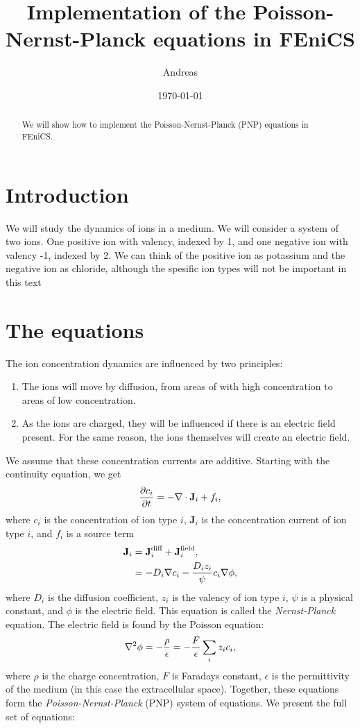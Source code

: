\documentclass[12pt]{article}
\title{Implementation of the Poisson-Nernst-Planck equations in FEniCS}
\date{\today}
\author{Andreas}
\newcommand{\Jvec}{\textbf{J}}
\begin{document}
\maketitle

\begin{abstract}
We will show how to implement the Poisson-Nernst-Planck (PNP) equations in FEniCS. 
\end{abstract}

\section{Introduction}
We will study the dynamics of ions in a medium. We will consider a system of two ions. One positive ion with valency, indexed by 1, and one negative ion with valency -1, indexed by 2. We can think of the positive ion as potassium and the negative ion as chloride, although the spesific ion types will not be important in this text

\section{The equations}
The ion concentration dynamics are influenced by two principles: 
\begin{enumerate}
\item The ions will move by diffusion, from areas of with high concentration to areas of low concentration. 
\item As the ions are charged, they will be influenced if there is an electric field present. For the same reason, the ions themselves will create an electric field. 
\end{enumerate}
We assume that these concentration currents are additive. Starting with the continuity equation, we get
\begin{equation}
{\partial c_i \over \partial t} = - \nabla \cdot \Jvec_i + f_i,
\end{equation}
where $c_i$ is the concentration of ion type $i$, $\Jvec_i$ is the concentration current of ion type $i$, and $f_i$ is a source term
\begin{align}
\Jvec_i & = \Jvec_i^\text{diff} + \Jvec_i^{\text{field}}, \\ 
 &= -D_i\nabla c_i - {D_iz_i \over \psi} c_i \nabla \phi,
\end{align}
where $D_i$ is the diffusion coefficient, $z_i$ is the valency of ion type $i$, $\psi$ is a physical constant, and $\phi$ is the electric field. This equation is called the \textit{Nernst-Planck} equation. The electric field is found by the Poisson equation: 
\begin{equation}
\nabla^2 \phi = -{\rho \over \epsilon} = -{F \over \epsilon} \sum_i z_i c_i,
\end{equation}
where $\rho$ is the charge concentration, $F$ is Faradays constant, $\epsilon$ is the permittivity of the medium (in this case the extracellular space). Together, these equations form the \textit{Poisson-Nernst-Planck} (PNP) system of equations. We present the full set of equations: 
\end{document}
